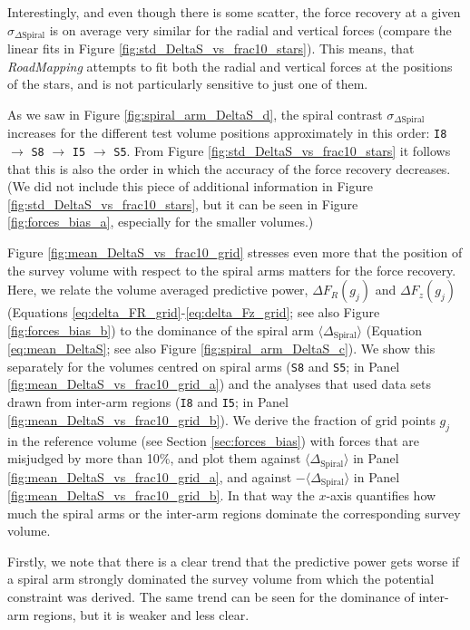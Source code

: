 \documentclass[iop,revtex4,numberedappendix,appendixfloats]{emulateapj}
\newcommand{\RM}{{\sl RoadMapping}}
\begin{document}
Interestingly, and even though there is some scatter, the force recovery at a given $\sigma_{\Delta\text{Spiral}}$ is on average very similar for the radial and vertical forces (compare the linear fits in Figure \ref{fig:std_DeltaS_vs_frac10_stars}). This means, that \RM{} attempts to fit both the radial and vertical forces at the positions of the stars, and is not particularly sensitive to just one of them.

As we saw in Figure \ref{fig:spiral_arm_DeltaS_d}, the spiral contrast $\sigma_{\Delta \text{Spiral}}$ increases for the different test volume positions approximately in this order: \texttt{I8} $\longrightarrow$ \texttt{S8} $\longrightarrow$ \texttt{I5} $\longrightarrow$ \texttt{S5}. From Figure \ref{fig:std_DeltaS_vs_frac10_stars} it follows that this is also the order in which the accuracy of the force recovery decreases. (We did not include this piece of additional information in Figure \ref{fig:std_DeltaS_vs_frac10_stars}, but it can be seen in Figure \ref{fig:forces_bias_a}, especially for the smaller volumes.)

Figure \ref{fig:mean_DeltaS_vs_frac10_grid} stresses even more that the position of the survey volume with respect to the spiral arms matters for the force recovery. Here, we relate the volume averaged predictive power, $\Delta F_R(g_j)$ and $\Delta F_z(g_j)$ (Equations \eqref{eq:delta_FR_grid}-\eqref{eq:delta_Fz_grid}; see also Figure \ref{fig:forces_bias_b}) to the dominance of the spiral arm $\langle \Delta_\text{Spiral} \rangle$ (Equation \eqref{eq:mean_DeltaS}; see also Figure \ref{fig:spiral_arm_DeltaS_c}). We show this separately for the volumes centred on spiral arms (\texttt{S8} and \texttt{S5}; in Panel \ref{fig:mean_DeltaS_vs_frac10_grid_a}) and the analyses that used data sets drawn from inter-arm regions (\texttt{I8} and \texttt{I5}; in Panel \ref{fig:mean_DeltaS_vs_frac10_grid_b}). We derive the fraction of grid points $g_j$ in the reference volume (see Section \ref{sec:forces_bias}) with forces that are misjudged by more than 10\%, and plot them against $\langle \Delta_\text{Spiral} \rangle$ in Panel \ref{fig:mean_DeltaS_vs_frac10_grid_a}, and against $-\langle \Delta_\text{Spiral} \rangle$ in Panel \ref{fig:mean_DeltaS_vs_frac10_grid_b}. In that way the $x$-axis quantifies how much the spiral arms or the inter-arm regions dominate the corresponding survey volume. 

Firstly, we note that there is a clear trend that the predictive power gets worse if a spiral arm strongly dominated the survey volume from which the potential constraint was derived. The same trend can be seen for the dominance of inter-arm regions, but it is weaker and less clear.
\end{document}
